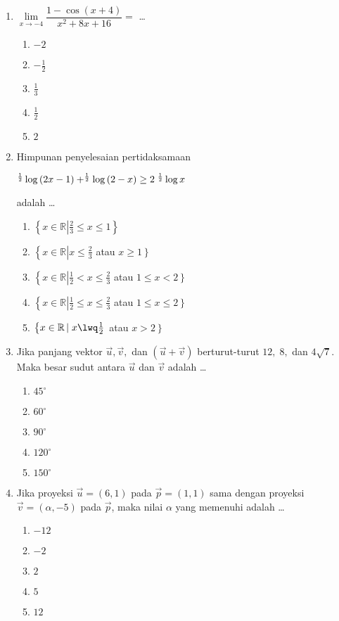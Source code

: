 \documentclass[A4,12PT, english, twocolumn]{journal}
\begin{document}
\begin{enumerate}
\item $\lim\limits_{x \longrightarrow -4} \dfrac{1- \cos{(x+4)}}{x^2+8x+16}=$ \dots
    \begin{enumerate}
        \item $-2$
        \item $-\frac{1}{2}$
        \item $\frac{1}{3}$
        \item $\frac{1}{2}$
        \item $2$
    \end{enumerate}

\item Himpunan penyelesaian pertidaksamaan
\begin{center}
    $^\frac{1}{2}\Log{(2x-1)} + ^\frac{1}{2}\Log{(2-x)} \geq 2 \; ^\frac{1}{2}\Log{x}$
\end{center}
adalah \dots
    \begin{enumerate}
        \item $\left\{ x \in \mathbb{R} \left|\right. \frac{2}{3} \leq x \leq 1 \right\}$
        \item $\left\{ x \in \mathbb{R} \left|\right. x \leq \frac{2}{3} \right.$ atau $\left. x \geq 1 \right\}$
        \item $\left\{ x \in \mathbb{R} \left|\right. \frac{1}{2}<x \leq \frac{2}{3} \right.$ atau $\left. 1 \leq x <2 \right\}$
        \item $\left\{ x \in \mathbb{R} \left|\right. \frac{1}{2} \leq x \leq \frac{2}{3} \right.$ atau $\left. 1 \leq x \leq 2 \right\}$
        \item $\left\{ x \in \mathbb{R} \left|\right. x \lwq \frac{1}{2} \right.$ atau $\left. x>2 \right\}$
    \end{enumerate}

\item Jika panjang vektor $\Vec{u}, \Vec{v},$ dan $(\Vec{u}+\Vec{v})$ berturut-turut $12, \; 8,$ dan $4\sqrt{7}$. Maka besar sudut antara $\Vec{u}$ dan $\Vec{v}$ adalah \dots
    \begin{enumerate}
        \item $45^\circ$
        \item $60^\circ$
        \item $90^\circ$
        \item $120^\circ$
        \item $150^\circ$
    \end{enumerate}

\item Jika proyeksi $\Vec{u}= (6,1)$ pada $\Vec{p}= (1,1)$ sama dengan proyeksi $\Vec{v}= (\alpha, -5)$ pada $\Vec{p}$, maka nilai $\alpha$ yang memenuhi adalah \dots
    \begin{enumerate}
        \item $-12$
        \item $-2$
        \item $2$
        \item $5$
        \item $12$
    \end{enumerate}


\end{enumerate}
\end{document}
